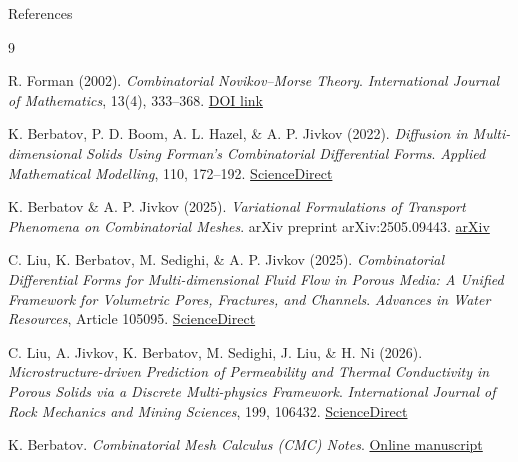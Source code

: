 \begin{frame}[allowframebreaks]{References}
\footnotesize

\begin{thebibliography}{9}

R. Forman (2002).  
\newblock \emph{Combinatorial Novikov--Morse Theory}.  
\newblock \textit{International Journal of Mathematics}, 13(4), 333--368.  
\newblock \href{https://www.worldscientific.com/doi/abs/10.1142/S0129167X02001265}{DOI link}

\vspace{0.2cm}

K. Berbatov, P. D. Boom, A. L. Hazel, \& A. P. Jivkov (2022).  
\newblock \emph{Diffusion in Multi-dimensional Solids Using Forman’s Combinatorial Differential Forms}.  
\newblock \textit{Applied Mathematical Modelling}, 110, 172--192.  
\newblock \href{https://www.sciencedirect.com/science/article/pii/S0307904X22002657\#bib0023}{ScienceDirect}

\vspace{0.2cm}

K. Berbatov \& A. P. Jivkov (2025).  
\newblock \emph{Variational Formulations of Transport Phenomena on Combinatorial Meshes}.  
\newblock arXiv preprint arXiv:2505.09443.  
\newblock \href{https://arxiv.org/abs/2505.09443}{arXiv}

\vspace{0.2cm}

C. Liu, K. Berbatov, M. Sedighi, \& A. P. Jivkov (2025).  
\newblock \emph{Combinatorial Differential Forms for Multi-dimensional Fluid Flow in Porous Media:  
A Unified Framework for Volumetric Pores, Fractures, and Channels}.  
\newblock \textit{Advances in Water Resources}, Article 105095.  
\newblock \href{https://www.sciencedirect.com/science/article/pii/S030917082500209X}{ScienceDirect}

\vspace{0.2cm}

C. Liu, A. Jivkov, K. Berbatov, M. Sedighi, J. Liu, \& H. Ni (2026).  
\newblock \emph{Microstructure-driven Prediction of Permeability and Thermal Conductivity in Porous Solids via a Discrete Multi-physics Framework}.  
\newblock \textit{International Journal of Rock Mechanics and Mining Sciences}, 199, 106432.  
\newblock \href{https://www.sciencedirect.com/science/article/pii/S1365160926000365}{ScienceDirect}

\vspace{0.2cm}

K. Berbatov.  
\newblock \emph{Combinatorial Mesh Calculus (CMC) Notes}.  
\newblock \href{https://kipiberbatov.github.io/cmc/main.pdf}{Online manuscript}

\end{thebibliography}

\end{frame}



